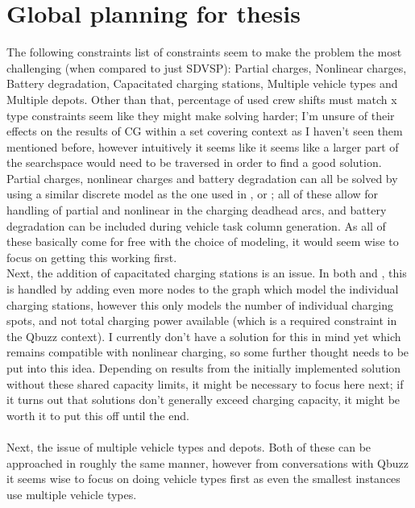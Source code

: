 \documentclass[]{article}
\begin{document}
\section{Global planning for thesis}
The following constraints list of constraints seem to make the problem the most challenging (when compared to just SDVSP): Partial charges, Nonlinear charges, Battery degradation, Capacitated charging stations, Multiple vehicle types and Multiple depots. Other than that, percentage of used crew shifts must match x type constraints seem like they might make solving harder; I'm unsure of their effects on the results of CG within a set covering context as I haven't seen them mentioned before, however intuitively it seems like it seems like a larger part of the searchspace would need to be traversed in order to find a good solution. \\
Partial charges, nonlinear charges and battery degradation can all be solved by using a similar discrete model as the one used in \citet{vanKootenNiekerk2017}, \citet{Zhang2021} or \citet{deVos2024}; all of these allow for handling of partial and nonlinear in the charging deadhead arcs, and battery degradation can be included during vehicle task column generation. As all of these basically come for free with the choice of modeling, it would seem wise to focus on getting this working first. \\
Next, the addition of capacitated charging stations is an issue. In both \citet{Zhang2021} and \citet{deVos2024}, this is handled by adding even more nodes to the graph which model the individual charging stations, however this only models the number of individual charging spots, and not total charging power available (which is a required constraint in the Qbuzz context). I currently don't have a solution for this in mind yet which remains compatible with nonlinear charging, so some further thought needs to be put into this idea. Depending on results from the initially implemented solution without these shared capacity limits, it might be necessary to focus here next; if it turns out that solutions don't generally exceed charging capacity, it might be worth it to put this off until the end. \\\\
Next, the issue of multiple vehicle types and depots. Both of these can be approached in roughly the same manner, however from conversations with Qbuzz it seems wise to focus on doing vehicle types first as even the smallest instances use multiple vehicle types.\\
\end{document}
